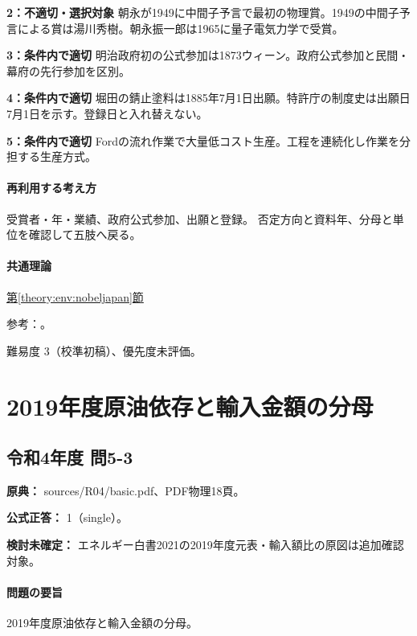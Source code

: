 \noindent\textbf{2：不適切・選択対象} 朝永が1949に中間子予言で最初の物理賞。1949の中間子予言による賞は湯川秀樹。朝永振一郎は1965に量子電気力学で受賞。\par

\noindent\textbf{3：条件内で適切} 明治政府初の公式参加は1873ウィーン。政府公式参加と民間・幕府の先行参加を区別。\par

\noindent\textbf{4：条件内で適切} 堀田の錆止塗料は1885年7月1日出願。特許庁の制度史は出願日7月1日を示す。登録日と入れ替えない。\par

\noindent\textbf{5：条件内で適切} Fordの流れ作業で大量低コスト生産。工程を連続化し作業を分担する生産方式。\par

\paragraph{再利用する考え方} 受賞者・年・業績、政府公式参加、出願と登録。 否定方向と資料年、分母と単位を確認して五肢へ戻る。

\paragraph{共通理論} \hyperref[theory:env:nobeljapan]{第\ref*{theory:env:nobeljapan}節}

\par 参考：\cite{env60_patent,env60_yukawa}。

\par 難易度 3（校準初稿）、優先度未評価。

\section{2019年度原油依存と輸入金額の分母}

\subsection{令和4年度 問5-3}
\label{q:r04-reg-basic-5-3}

\noindent\textbf{原典：} sources/R04/basic.pdf、PDF物理18頁。

\textbf{公式正答：} 1（single）。

\par\textbf{検討未確定：} エネルギー白書2021の2019年度元表・輸入額比の原図は追加確認対象。

\paragraph{問題の要旨} 2019年度原油依存と輸入金額の分母。

